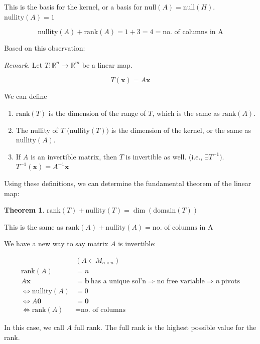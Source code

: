 \documentclass[12pt]{article}
\theoremstyle{plain}
\newtheorem{theorem}{Theorem}[section]
\theoremstyle{remark}
\theoremstyle{definition}
\begin{document}
This is the basis for the kernel, or a basis for
\(\text{null}{(A)} = \text{null}(H)\). \(\text{nullity}{(A)} = 1\)

\[\text{nullity}(A) + \text{rank}(A) = 1 + 3 = 4 = \text{no.\ of\ columns\ in\ A}\]

Based on this observation:

\emph{Remark.} Let \(T:\mathbb{R}^{n} \rightarrow \mathbb{R}^{m}\) be a
linear map.

\[T\left( \mathbf{x} \right) = A\mathbf{x}\]

We can define

\begin{enumerate}
\def\labelenumi{\arabic{enumi}.}
\item
  \(\text{rank}(T)\) is the dimension of the range of \(T\), which is
  the same as \(\text{rank}(A)\).
\item
  The nullity of \(T\) (\(\text{nullity}{(T)})\) is the dimension of the
  kernel, or the same as \(\text{nullity}{(A)}\).
\item
  If \(A\) is an invertible matrix, then \(T\) is invertible as well.
  (i.e., \(\exists T^{- 1})\).
  \(T^{- 1}\left( \mathbf{x} \right) = A^{- 1}\mathbf{x}\)
\end{enumerate}

Using these definitions, we can determine the fundamental theorem of the
linear map:

\begin{theorem}
\(\text{rank}(T) + \text{nullity}{(T)} = \dim\left( \text{domain}(T) \right)\)
\end{theorem}

This is the same as
\(\text{rank}(A) + \text{nullity}{(A)} = \text{no.\ of\ columns\ in\ A}\)

We have a new way to say matrix \(A\) is invertible:

\begin{align*}
&\left( A \in M_{n \times n} \right) \\
\text{rank}(A) &= n \\
A\mathbf{x} &= \mathbf{b}\ \text{has\ a\ unique\ sol'n} \Rightarrow \text{no\ free\ variable} \Rightarrow n\ \text{pivots} \\
\Leftrightarrow \text{nullity}(A) &= 0 \\
\Leftrightarrow A\mathbf{0} &= \mathbf{0} \\
\Leftrightarrow \text{rank}(A) &= \text{no.\ of\ columns}
\end{align*}


In this case, we call \(A\) full rank. The full rank is the highest
possible value for the rank.
\end{document}
